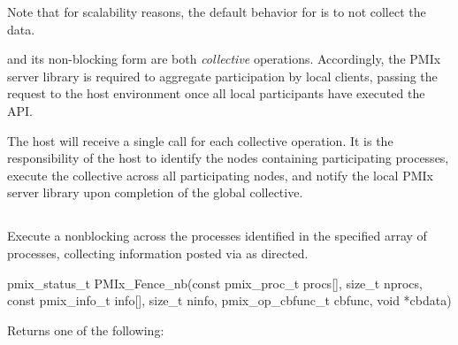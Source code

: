 Note that for scalability reasons, the default behavior for  is to not collect the data.

\adviceimplstart
{} and its non-blocking form are both \emph{collective} operations. Accordingly, the \ac{PMIx} server library is required to aggregate participation by local clients, passing the request to the host environment once all local participants have executed the \ac{API}.
\adviceimplend

\advicermstart
The host will receive a single call for each collective operation. It is the responsibility of the host to identify the nodes containing participating processes, execute the collective across all participating nodes, and notify the local \ac{PMIx} server library upon completion of the global collective.
\advicermend

\subsection{}

\summary

Execute a nonblocking  across the processes identified in the specified array of processes, collecting information posted via  as directed.

\format

\cspecificstart
\begin{codepar}
pmix_status_t
PMIx_Fence_nb(const pmix_proc_t procs[], size_t nprocs,
              const pmix_info_t info[], size_t ninfo,
              pmix_op_cbfunc_t cbfunc, void *cbdata)
\end{codepar}
\cspecificend

\begin{arglist}
\end{arglist}

Returns one of the following:

